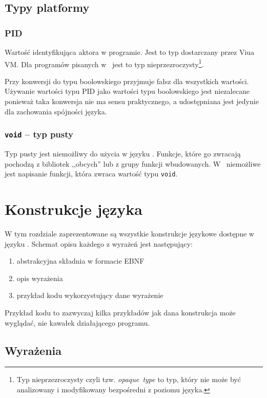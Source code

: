 \subsection{Typy platformy}

\subsubsection{PID}

Wartość identyfikująca aktora w programie.
Jest to typ dostarczany przez Viua VM. Dla programów pisanych w \ViuAct\ jest to
typ nieprzezroczysty\footnote{Typ nieprzezroczysty czyli tzw. \emph{opaque~type}
to typ, który nie może być analizowany i modyfikowany bezpośredni z poziomu
języka.}.

Przy konwersji do typu boolowskiego przyjmuje fałsz dla wszystkich wartości.
Używanie wartości typu PID jako wartości typu boolowskiego jest niezalecane
ponieważ taka konwersja nie ma sensu praktycznego, a udostępniana jest jedynie
dla zachowania spójności języka.

\subsubsection{\texttt{void} -- typ pusty}

Typ pusty jest niemożliwy do użycia w języku \ViuAct. Funkcje, które go zwracają
pochodzą z bibliotek ,,obcych'' lub z grupy funkcji wbudowanych. W \ViuAct\
niemożliwe jest napisanie funkcji, która zwraca wartość typu \texttt{void}.

\section{Konstrukcje języka}

W tym rozdziale zaprezentowane są wszystkie konstrukcje językowe dostępne w języku \ViuAct.
Schemat opisu każdego z wyrażeń jest następujący:

\begin{enumerate}
    \item abstrakcyjna składnia w formacie EBNF
    \item opis wyrażenia
    \item przykład kodu wykorzystujący dane wyrażenie
\end{enumerate}

Przykład kodu to zazwyczaj kilka przykładów jak dana konstrukcja może wyglądać, nie kawałek działającego
programu.

\subsection{Wyrażenia}
\label{language_expressions}

